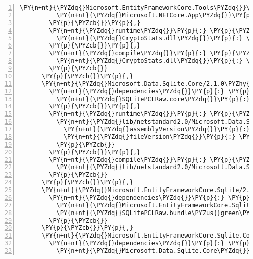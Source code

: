 \begin{Verbatim}[commandchars=\\\{\},numbers=left,firstnumber=1,stepnumber=1,numberblanklines=0]
          \PY{n+nt}{\PYZdq{}Microsoft.EntityFrameworkCore.Tools\PYZdq{}}\PY{p}{:} \PY{l+s+s2}{\PYZdq{}2.1.0\PYZhy{}rc1\PYZhy{}final\PYZdq{}}\PY{p}{,}
          \PY{n+nt}{\PYZdq{}Microsoft.NETCore.App\PYZdq{}}\PY{p}{:} \PY{l+s+s2}{\PYZdq{}2.1.0\PYZhy{}rc1\PYZdq{}}
        \PY{p}{\PYZcb{}}\PY{p}{,}
        \PY{n+nt}{\PYZdq{}runtime\PYZdq{}}\PY{p}{:} \PY{p}{\PYZob{}}
          \PY{n+nt}{\PYZdq{}CryptoStats.dll\PYZdq{}}\PY{p}{:} \PY{p}{\PYZob{}}\PY{p}{\PYZcb{}}
        \PY{p}{\PYZcb{}}\PY{p}{,}
        \PY{n+nt}{\PYZdq{}compile\PYZdq{}}\PY{p}{:} \PY{p}{\PYZob{}}
          \PY{n+nt}{\PYZdq{}CryptoStats.dll\PYZdq{}}\PY{p}{:} \PY{p}{\PYZob{}}\PY{p}{\PYZcb{}}
        \PY{p}{\PYZcb{}}
      \PY{p}{\PYZcb{}}\PY{p}{,}
      \PY{n+nt}{\PYZdq{}Microsoft.Data.Sqlite.Core/2.1.0\PYZhy{}rc1\PYZhy{}final\PYZdq{}}\PY{p}{:} \PY{p}{\PYZob{}}
        \PY{n+nt}{\PYZdq{}dependencies\PYZdq{}}\PY{p}{:} \PY{p}{\PYZob{}}
          \PY{n+nt}{\PYZdq{}SQLitePCLRaw.core\PYZdq{}}\PY{p}{:} \PY{l+s+s2}{\PYZdq{}1.1.10\PYZdq{}}
        \PY{p}{\PYZcb{}}\PY{p}{,}
        \PY{n+nt}{\PYZdq{}runtime\PYZdq{}}\PY{p}{:} \PY{p}{\PYZob{}}
          \PY{n+nt}{\PYZdq{}lib/netstandard2.0/Microsoft.Data.Sqlite.dll\PYZdq{}}\PY{p}{:} \PY{p}{\PYZob{}}
            \PY{n+nt}{\PYZdq{}assemblyVersion\PYZdq{}}\PY{p}{:} \PY{l+s+s2}{\PYZdq{}2.1.0.0\PYZdq{}}\PY{p}{,}
            \PY{n+nt}{\PYZdq{}fileVersion\PYZdq{}}\PY{p}{:} \PY{l+s+s2}{\PYZdq{}2.1.0.18116\PYZdq{}}
          \PY{p}{\PYZcb{}}
        \PY{p}{\PYZcb{}}\PY{p}{,}
        \PY{n+nt}{\PYZdq{}compile\PYZdq{}}\PY{p}{:} \PY{p}{\PYZob{}}
          \PY{n+nt}{\PYZdq{}lib/netstandard2.0/Microsoft.Data.Sqlite.dll\PYZdq{}}\PY{p}{:} \PY{p}{\PYZob{}}\PY{p}{\PYZcb{}}
        \PY{p}{\PYZcb{}}
      \PY{p}{\PYZcb{}}\PY{p}{,}
      \PY{n+nt}{\PYZdq{}Microsoft.EntityFrameworkCore.Sqlite/2.1.0\PYZhy{}rc1\PYZhy{}final\PYZdq{}}\PY{p}{:} \PY{p}{\PYZob{}}
        \PY{n+nt}{\PYZdq{}dependencies\PYZdq{}}\PY{p}{:} \PY{p}{\PYZob{}}
          \PY{n+nt}{\PYZdq{}Microsoft.EntityFrameworkCore.Sqlite.Core\PYZdq{}}\PY{p}{:} \PY{l+s+s2}{\PYZdq{}2.1.0\PYZhy{}rc1\PYZhy{}final\PYZdq{}}\PY{p}{,}
          \PY{n+nt}{\PYZdq{}SQLitePCLRaw.bundle\PYZus{}green\PYZdq{}}\PY{p}{:} \PY{l+s+s2}{\PYZdq{}1.1.10\PYZdq{}}
        \PY{p}{\PYZcb{}}
      \PY{p}{\PYZcb{}}\PY{p}{,}
      \PY{n+nt}{\PYZdq{}Microsoft.EntityFrameworkCore.Sqlite.Core/2.1.0\PYZhy{}rc1\PYZhy{}final\PYZdq{}}\PY{p}{:} \PY{p}{\PYZob{}}
        \PY{n+nt}{\PYZdq{}dependencies\PYZdq{}}\PY{p}{:} \PY{p}{\PYZob{}}
          \PY{n+nt}{\PYZdq{}Microsoft.Data.Sqlite.Core\PYZdq{}}\PY{p}{:} \PY{l+s+s2}{\PYZdq{}2.1.0\PYZhy{}rc1\PYZhy{}final\PYZdq{}}\PY{p}{,}

\end{Verbatim}
